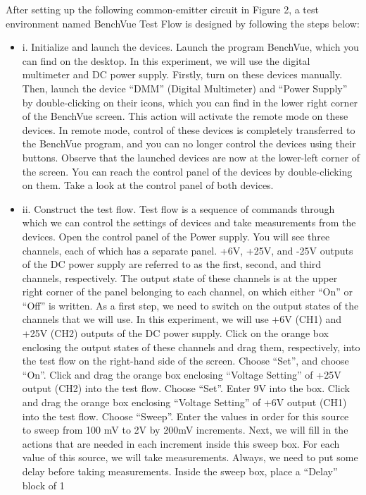 \documentclass[letterpaper,12pt]{article}
\begin{document}
After setting up the following common-emitter circuit in Figure 2, a test environment named BenchVue Test Flow is designed by following the steps below:
\begin{itemize}
    \item i. Initialize and launch the devices.
    Launch the program BenchVue, which you can find on the desktop.
    In this experiment, we will use the digital multimeter and DC power supply. Firstly,
    turn on these devices manually. Then, launch the device “DMM” (Digital Multimeter)
    and “Power Supply” by double-clicking on their icons, which you can find in the lower
    right corner of the BenchVue screen. This action will activate the remote mode on these
    devices. In remote mode, control of these devices is completely transferred to the
    BenchVue program, and you can no longer control the devices using their buttons.
    Observe that the launched devices are now at the lower-left corner of the screen. You
    can reach the control panel of the devices by double-clicking on them. Take a look at
    the control panel of both devices.
    \item ii. Construct the test flow. Test flow is a sequence of commands through which we can control
    the settings of devices and take measurements from the devices.
    Open the control panel of the Power supply. You will see three channels, each of which
    has a separate panel. +6V, +25V, and -25V outputs of the DC power supply are
    referred to as the first, second, and third channels, respectively.
    The output state of these channels is at the upper right corner of the panel belonging to
    each channel, on which either “On” or “Off” is written. As a first step, we need to switch
    on the output states of the channels that we will use. In this experiment, we will use
    +6V (CH1) and +25V (CH2) outputs of the DC power supply. Click on the orange box
    enclosing the output states of these channels and drag them, respectively, into the test
    flow on the right-hand side of the screen. Choose “Set”, and choose “On”.
    Click and drag the orange box enclosing “Voltage Setting” of +25V output (CH2) into
    the test flow. Choose “Set”. Enter 9V into the box.
    Click and drag the orange box enclosing “Voltage Setting” of +6V output (CH1) into
    the test flow. Choose “Sweep”. Enter the values in order for this source to sweep from
    100 mV to 2V by 200mV increments. Next, we will fill in the actions that are needed
    in each increment inside this sweep box.
    For each value of this source, we will take measurements. Always, we need to put some delay before taking measurements. Inside the sweep box, place a “Delay” block of 1

\end{itemize}
\end{document}

